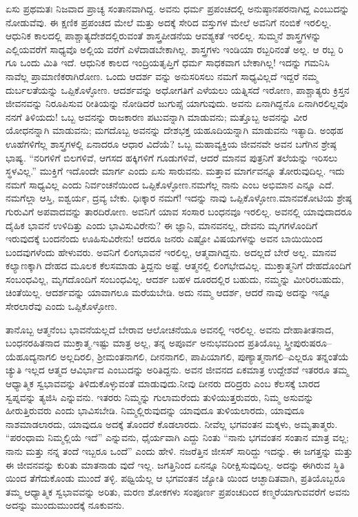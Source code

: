 ಏಸು ಪ್ರಥಮತಃ ನಿಜವಾದ ಪ್ರಾಚ್ಯ ಸಂತಾನವಾಗಿದ್ದ. ಅವನು ಧರ್ಮ ಪ್ರಪಂಚದಲ್ಲಿ ಅನುಷ್ಠಾನಪರನಾಗಿದ್ದ ಎಂಬುದನ್ನು ನೋಡುವೆವು. ಈ ಕ್ಷಣಿಕ ಪ್ರಪಂಚದ ಮೇಲೆ ಮತ್ತು ಅದಕ್ಕೆ ಸೇರಿದ ವಸ್ತುಗಳ ಮೇಲೆ ಅವನಿಗೆ ನಂಬಿಕೆ ಇರಲಿಲ್ಲ. ಆಧುನಿಕ ಕಾಲದಲ್ಲಿ ಪಾಶ್ಚಾತ್ಯದೇಶದಲ್ಲಿರುವಂತೆ ಶಾಸ್ತ್ರಪೀಡನೆಯ ಆವಶ್ಯಕತೆ ಇರಲಿಲ್ಲ. ಸುಮ್ಮನೆ ಶಾಸ್ತ್ರಗಳನ್ನು ಎಲ್ಲಿಯವರೆಗೆ ಸಾಧ್ಯವೊ ಅಲ್ಲಿಯ ವರೆಗೆ ಎಳೆದಾಡಬೇಕಾಗಿಲ್ಲ. ಶಾಸ್ತ್ರಗಳು ಇಂಡಿಯಾ ರಬ್ಬರಿನಂತೆ ಅಲ್ಲ. ಆ ರಬ್ಬ ರಿ ಗೂ ಒಂದು ಮಿತಿ ಇದೆ. ಆಧುನಿಕ ಕಾಲದ ಇಂದ್ರಿಯತೃಪ್ತಿಗೆ ಧರ್ಮ ಸಾಧಕವಾಗ ಬೇಕಾಗಿಲ್ಲ! ಇದನ್ನು ಗಮನಿಸಿ ನಾವೆಲ್ಲ ಪ್ರಾಮಾಣಿಕರಾಗಿರೋಣ. ಒಂದು ಆದರ್ಶ ವನ್ನು ಅನುಸರಿಸಲು ನಮಗೆ ಸಾಧ್ಯವಿಲ್ಲದೆ ಇದ್ದರೆ ನಮ್ಮ ದುರ್ಬಲತೆಯನ್ನು ಒಪ್ಪಿಕೊಳ್ಳೋಣ. ಆದರ್ಶವನ್ನು ಅಧೋಗತಿಗೆ ಎಳೆಯಲು ಯತ್ನಿಸದೆ ಇರೋಣ, ಪಾಶ್ಚಾತ್ಯರು ಕ್ರಿಸ್ತನ ಜೀವನವನ್ನು ನಿರೂಪಿಸುವ ರೀತಿಯನ್ನು ನೋಡಿದರೆ ಜುಗುಪ್ಸೆ ಯಾಗುವುದು. ಅವನು ಏನಾಗಿದ್ದನೊ ಏನಾಗಿರಲಿಲ್ಲವೊ ನನಗೆ ತಿಳಿಯದು! ಒಬ್ಬ ಅವನನ್ನು ರಾಜಕಾರಣ ಪಟುವನ್ನಾಗಿ ಮಾಡುವನು; ಮತ್ತೊಬ್ಬ ಅವನನ್ನು ವೀರ ಯೋಧನನ್ನಾಗಿ ಮಾಡುವನು; ಮಗದೊಬ್ಬ ಅವನನ್ನು ದೇಶಭಕ್ತ ಯಹೂದಿಯನ್ನಾಗಿ ಮಾಡುವನು ಇತ್ಯಾದಿ. ಅಂಥಹ ಊಹೆಗಳಿಗೆಲ್ಲ ಶಾಸ್ತ್ರಗಳಲ್ಲಿ ಏನಾದರೂ ಆಧಾರ ವಿದೆಯೆ? ಒಬ್ಬ ಮಹಾವ್ಯಕ್ತಿಯ ಜೀವನವೇ ಅವನ ಬಗೆಗಿನ ಶ್ರೇಷ್ಠ ಭಾಷ್ಯ. “ನರಿಗಳಿಗೆ ಬಿಲಗಳಿವೆ, ಆಗಸದ ಹಕ್ಕಿಗಳಿಗೆ ಗೂಡುಗಳಿವೆ, ಆದರೆ ಮಾನವ ಪುತ್ರನಿಗೆ ತಲೆಯನ್ನು ಇರಿಸಲು ಸ್ಥಳವಿಲ್ಲ.” ಮುಕ್ತಿಗೆ ಇದೊಂದೇ ಮಾರ್ಗ ಎಂದು ಏಸು ಸಾರುವನು. ಮತ್ತಾವ ಮಾರ್ಗವನ್ನೂ ತೋರುವುದಿಲ್ಲ. ಇದು ನಮಗೆ ಸಾಧ್ಯವಿಲ್ಲ ಎಂದು ನಿರ್ವಂಚನೆಯಿಂದ ಒಪ್ಪಿಕೊಳ್ಳೋಣ.ನಮಗೆಲ್ಲ ನಾನು ಎಂಬ ಅಭಿಮಾನ ಎನ್ನೂ ಎದೆ. ನಮಗೆಲ್ಲಾ ಆಸ್ತಿ, ಐಶ್ವರ್ಯ, ದ್ರವ್ಯ ಬೇಕು. ಧಿಃಕ್ಕಾರ ನಮಗೆ! ಇದನ್ನು ನಾವು ಒಪ್ಪಿಕೊಳ್ಳೋಣ.ಮಾನವಕೋಟಿಯ ಶ್ರೇಷ್ಠ ಗುರುವಿಗೆ ಅಪವಾದವನ್ನು ತಾರದಿರೋಣ. ಅವನಿಗೆ ಯಾವ ಸಂಸಾರ ಬಂಧನವೂ ಇರಲಿಲ್ಲ. ಅವನಲ್ಲಿ ಯಾವುದಾದರೂ ದೈಹಿಕ ಭಾವನೆ ಉಳಿದಿತ್ತು ಎಂದು ಭಾವಿಸುವಿರೇನು? ಈ ಜ್ಞಾನಿ, ಮಾನವನಲ್ಲ, ದೇವನು ಮೃಗಗಳೊಂದಿಗೆ ಇರುವುದಕ್ಕೆ ಬಂದನೆಂದು ಊಹಿಸುವಿರೇನು! ಆದರೂ ಜನರು ಎಷ್ಟೋ ವಿಷಯಗಳನ್ನು ಅವನ ಬಾಯಿಯಿಂದ ಬಂದವುಗಳೆಂದು ಹೇಳುವರು. ಅವನಿಗೆ ಲಿಂಗಭಾವನೆ ಇರಲಿಲ್ಲ, ಆತ್ಮವಾಗಿದ್ದನು. ಅದಲ್ಲದೆ ಬೇರೆ ಅಲ್ಲ. ಮಾನವ ಕಲ್ಯಾಣಕ್ಕಾಗಿ ದೇಹದ ಮೂಲಕ ಕೆಲಸಮಾಡು ತ್ತಿದ್ದನು ಅಷ್ಟೆ. ಆತ್ಮನಲ್ಲಿ ಲಿಂಗಭೇದವಿಲ್ಲ. ಮುಕ್ತಾತ್ಮನಿಗೆ ದೇಹದೊಂದಿಗೆ ಸಂಬಂಧವಿಲ್ಲ, ಮೃಗದೊಂದಿಗೆ ಸಂಬಂಧವಿಲ್ಲ. ಆದರ್ಶ ಬಹಳ ದೂರದಲ್ಲಿರ ಬಹುದು, ನಮ್ಮನ್ನು ಮೀರಿರಬಹುದು, ಚಿಂತೆಯಿಲ್ಲ. ಆದರ್ಶವನ್ನು ಯಾವಾಗಲೂ ಮರೆಯಬೇಡಿ. ಅದು ನಮ್ಮ ಆದರ್ಶ, ಆದರೆ ನಾವು ಅದನ್ನು ಇನ್ನೂ ಸೇರಲಾರೆವು ಎಂದು ಒಪ್ಪಿಕೊಳ್ಳೋಣ.

ತಾನೊಬ್ಬ ಆತ್ಮನೆಂಬ ಭಾವನೆಯಲ್ಲದೆ ಬೇರಾವ ಆಲೋಚನೆಯೂ ಅವನಲ್ಲಿ ಇರಲಿಲ್ಲ. ಅವನು ದೇಹಾತೀತನಾದ, ಬಂಧನರಹಿತನಾದ ಮುಕ್ತಾತ್ಮ.ಇಷ್ಟು ಮಾತ್ರ ಅಲ್ಲ, ತನ್ನ ಅಪೂರ್ವ ಅನುಭವದಿಂದ ಪ್ರತಿಯೊಬ್ಬ ಸ್ತ್ರೀಪುರುಷರೂ– ಯೆಹೂದ್ಯನಾಗಲಿ ಅಲ್ಲದಿರಲಿ, ಶ‍್ರೀಮಂತನಾಗಲಿ, ದೀನನಾಗಲಿ, ಪಾಪಿಯಾಗಲಿ, ಪುಣ್ಯಾತ್ಮನಾಗಲಿ–ಎಲ್ಲರೂ ತನ್ನಂತೆಯೆ ಚ್ಯುತಿ ಇಲ್ಲದ ಆತ್ಮದ ಆವಿರ್ಭಾವ ಎಂಬುದನ್ನು ಅರಿತಿದ್ದನು. ಅವನ ಜೀವನದ ಏಕಮಾತ್ರ ಉದ್ದೇಶವೆ ಇತರರೂ ತಮ್ಮ ಆಧ್ಯಾತ್ಮಿಕ ಸ್ವಭಾವವನ್ನು ತಿಳಿದುಕೊಳ್ಳುವಂತೆ ಮಾಡುವುದು.ನೀವು ದೀನರು ದರಿದ್ರರು ಎಂಬ ಕೆಲಸಕ್ಕೆ ಬಾರದ ಸ್ವಪ್ನವನ್ನು ತ್ಯಜಿಸಿ ಎನ್ನುವನು. ಇತರರು ನಿಮ್ಮನ್ನು ಗುಲಾಮರೆಂದು ತುಳಿಯುತ್ತರುವರು, ನಿಮ್ಮ ಅಸುವನ್ನು ಹೀರುತ್ತಿರುವರು ಎಂದು ಭಾವಿಸಬೇಡಿ. ನಿಮ್ಮಲ್ಲಿರುವುದನ್ನು ಯಾವುದೂ ತುಳಿಯಲಾರದು, ಯಾವುದೂ ನಾಶಮಾಡಲಾರದು, ಯಾವುದೂ ಅದಕ್ಕೆ ತೊಂದರೆ ಕೊಡಲಾರದು. ನೀವೆಲ್ಲ ಭಗವಂತನ ಮಕ್ಕಳು, ಅಮೃತಾತ್ಮರು. “ಪರಂಧಾಮ ನಿಮ್ಮಲ್ಲಿಯೆ ಇದೆ” ಎನ್ನುವನು, ಧೈರ್ಯವಾಗಿ ಎದ್ದು ನಿಂತು “ನಾನು ಭಗವಂತನ ಸಂತಾನ ಮಾತ್ರ ವಲ್ಲ; ನಾನು ಮತ್ತು ನನ್ನ ತಂದೆ ಇಬ್ಬರೂ ಒಂದೆ” ಎಂದು ಹೇಳಿ. ನಜರೆತ್ತಿನ ಜೀಸಸ್​ ಸಾರಿದ್ದು ಇದನ್ನು. ಈ ಜಗತ್ತನ್ನು ಮತ್ತು ಈ ಜೀವನವನ್ನು ಕುರಿತು ಮಾತನಾಡು ವುದೆ ಇಲ್ಲ. ಜಗತ್ತಿನಿಂದ ಏನನ್ನೂ ನಿರೀಕ್ಷಿಸುವುದಿಲ್ಲ. ಅದನ್ನು ಈಗಿರುವ ಸ್ಥಿತಿ ಯಿಂದ ತೆಗೆದುಕೊಂಡು ಮುಂದೆ ತಳ್ಳಿ. ಪಥ್ವಿಯೆಲ್ಲ ಆ ಭಗವಂತನ ಜ್ಯೋತಿ ಯಿಂದ ಆಚ್ಛಾದಿತವಾಗಿ, ಪ್ರತಿಯೊಬ್ಬರೂ ತಮ್ಮ ಆಧ್ಯಾತ್ಮಿಕ ಸ್ವಭಾವವನ್ನು ಅರಿತು, ಮರಣ ಶೋಕಗಳು ಸಂಪೂರ್ಣ ಪ್ರಪಂಚದಿಂದ ಕಣ್ಮರೆಯಾಗುವವರೆಗೆ ಅವನು ಅದನ್ನು ಮುಂದುಮುಂದಕ್ಕೆ ನೂಕುವನು.

